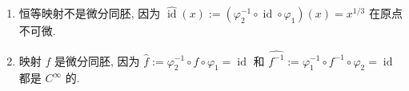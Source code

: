 \begin{description}[font=\normalfont,leftmargin=2em,labelwidth=1.5em]
\begin{enumerate}[label=(\alph*),ref=\alph*,leftmargin=*]
\item 恒等映射不是微分同胚, 因为 $\widehat{\operatorname{id}}(x):=(\varphi_2^{-1}\circ\operatorname{id}\circ\varphi_1)(x)=x^{1/3}$ 在原点不可微.
\item 映射 $f$ 是微分同胚, 因为 $\widehat f:=\varphi_2^{-1}\circ f\circ\varphi_1=\operatorname{id}$ 和 $\widehat{f^{-1}}:=\varphi_1^{-1}\circ f^{-1}\circ\varphi_2=\operatorname{id}$ 都是 $C^\infty$ 的.
\end{enumerate}
\end{description}

